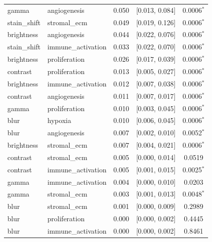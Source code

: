 \begin{table}[t]
\begin{tabular}{llccc}
gamma & angiogenesis & 0.050 & [0.013, 0.084] & 0.0006$^{*}$ \\
stain\_shift & stromal\_ecm & 0.049 & [0.019, 0.126] & 0.0006$^{*}$ \\
brightness & angiogenesis & 0.044 & [0.022, 0.076] & 0.0006$^{*}$ \\
stain\_shift & immune\_activation & 0.033 & [0.022, 0.070] & 0.0006$^{*}$ \\
brightness & proliferation & 0.026 & [0.017, 0.039] & 0.0006$^{*}$ \\
contrast & proliferation & 0.013 & [0.005, 0.027] & 0.0006$^{*}$ \\
brightness & immune\_activation & 0.012 & [0.007, 0.038] & 0.0006$^{*}$ \\
contrast & angiogenesis & 0.011 & [0.007, 0.017] & 0.0006$^{*}$ \\
gamma & proliferation & 0.010 & [0.003, 0.045] & 0.0006$^{*}$ \\
blur & hypoxia & 0.010 & [0.006, 0.045] & 0.0006$^{*}$ \\
blur & angiogenesis & 0.007 & [0.002, 0.010] & 0.0052$^{*}$ \\
brightness & stromal\_ecm & 0.007 & [0.004, 0.021] & 0.0006$^{*}$ \\
contrast & stromal\_ecm & 0.005 & [0.000, 0.014] & 0.0519 \\
contrast & immune\_activation & 0.005 & [0.001, 0.015] & 0.0025$^{*}$ \\
gamma & immune\_activation & 0.004 & [0.000, 0.010] & 0.0203 \\
gamma & stromal\_ecm & 0.003 & [0.001, 0.013] & 0.0048$^{*}$ \\
blur & stromal\_ecm & 0.001 & [0.000, 0.009] & 0.2989 \\
blur & proliferation & 0.000 & [0.000, 0.002] & 0.4445 \\
blur & immune\_activation & 0.000 & [0.000, 0.002] & 0.8461 \\
\bottomrule
\end{tabular}
\end{table}
